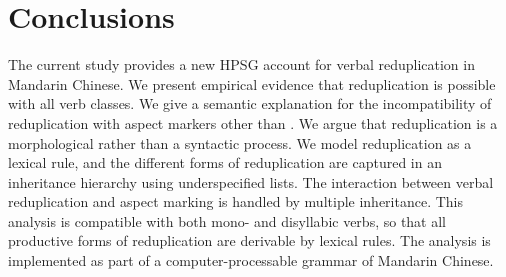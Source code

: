 \section{Conclusions}\label{sec:conclu}

The current study provides a new HPSG account for verbal reduplication in Mandarin Chinese.
We present empirical evidence that reduplication is possible with all verb classes.
We give a semantic explanation for the incompatibility of reduplication with aspect markers other than .
We argue that reduplication is a morphological rather than a syntactic process.
We model reduplication as a lexical rule,
and the different forms of reduplication are captured in an inheritance hierarchy using underspecified lists.
The interaction between verbal reduplication and aspect marking is handled by multiple inheritance.
This analysis is compatible with both mono- and disyllabic verbs, 
so that all productive forms of reduplication are derivable by lexical rules.
The analysis is implemented as part of a computer-processable grammar of Mandarin Chinese.
